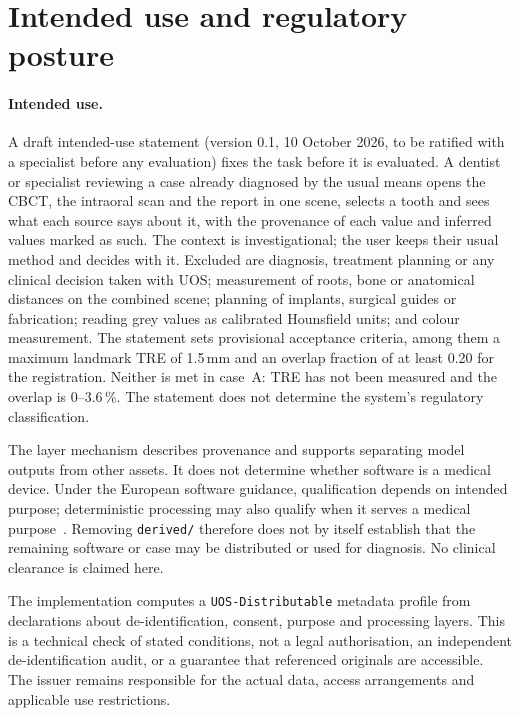 \documentclass[11pt,a4paper]{article}
\newcommand{\code}[1]{\texttt{\small #1}}
\begin{document}
\section{Intended use and regulatory posture}\label{sec:regulatory}

\paragraph{Intended use.}\label{sec:intended-use} A draft intended-use statement (version
0.1, 10 October 2026, to be ratified with a specialist before any evaluation) fixes the task
before it is evaluated. A dentist or specialist reviewing a case already diagnosed by the
usual means opens the CBCT, the intraoral scan and the report in one scene, selects a tooth
and sees what each source says about it, with the provenance of each value and inferred
values marked as such. The context is investigational; the user keeps their usual method and
decides with it. Excluded are diagnosis, treatment planning or any clinical decision taken
with UOS; measurement of roots, bone or anatomical distances on the combined scene; planning
of implants, surgical guides or fabrication; reading grey values as calibrated Hounsfield
units; and colour measurement. The statement sets provisional acceptance criteria, among
them a maximum landmark TRE of 1.5\,mm and an overlap fraction of at least 0.20 for the
registration. Neither is met in case~A: TRE has not been measured and the overlap
is 0--3.6\,\%. The statement does not determine the system's regulatory classification.


The layer mechanism describes provenance and supports separating model outputs from other
assets. It does not determine whether software is a medical device. Under the European
software guidance, qualification depends on intended purpose; deterministic processing may
also qualify when it serves a medical purpose~\cite{mdcg}. Removing \code{derived/} therefore
does not by itself establish that the remaining software or case may be distributed or used
for diagnosis. No clinical clearance is claimed here.

The implementation computes a \code{UOS-Distributable} metadata profile from declarations
about de-identification, consent, purpose and processing layers. This is a technical check
of stated conditions, not a legal authorisation, an independent de-identification audit,
or a guarantee that referenced originals are accessible. The issuer remains responsible
for the actual data, access arrangements and applicable use restrictions.
\end{document}
